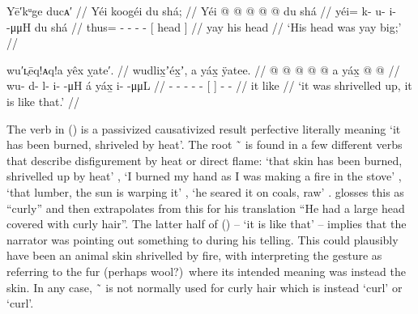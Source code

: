 \ex\label{ex:93-24-head-big}%
%
\begingl
	\glpreamble	Yē′kᵘge ducᴀ′ //
	\glpreamble	Yéi koogéi du shá; // 
	\gla	Yéi @  @ {} @ {} @ {} @ {}
		{} du shá {} //
	\glb	yéi= k- u- i-  -μμH
		{} du shá {} //
	\glc	thus= - - -  -
		{}[  head {}] //
	\gld	yay  {} {} {} {}
		{} his head {} //
	\glft	‘His head was yay big;’
		//
\endgl
\xe

\ex\label{ex:93-25-shriveled-like-that}%
%
\begingl
	\glpreamble	wu′ʟ̣ēq!ᴀq!a yêx ỵate′. //
	\glpreamble	wudlix̱ʼéx̱ʼ, a yáx̱ ÿatee. //
	\gla	{} @ {} @ {} @ {} @ {} @ {}
		{} a yáx̱ {}
		 @ {} @ {} //
	\glb	wu- d- l- i-  -μH
		{} á yáx̱ {}
		i-  -μμL //
	\glc	{}- - - -  -
		{}[   {}]
		-  - //
	\gld	 {} {} {} {} {} {}
		{} it like {}
		 {} {} //
	\glft	‘it was shrivelled up, it is like that.’
		//
\endgl
\xe

The verb  in (\lastx) is a passivized causativized result perfective literally meaning ‘it has been burned, shriveled by heat’.
The root  \~\  is found in a few different verbs that describe disfigurement by heat or direct flame:  ‘that skin has been burned, shrivelled up by heat’ \parencite[38.362]{story-naish:1973},  ‘I burned my hand as I was making a fire in the stove’ \parencite[388.364]{story-naish:1973},  ‘that lumber, the sun is warping it’ \parencite[242]{story-naish:1973},  ‘he seared it on coals, raw’ \parencite[f01/188]{leer:1973}.
\citeauthor{swanton:1909} glosses this as “curly” and then extrapolates from this for his translation “He had a large head covered with curly hair”.
The latter half of (\lastx) –  ‘it is like that’ – implies that the narrator was pointing out something to \citeauthor{swanton:1909} during his telling.
This could plausibly have been an animal skin shrivelled by fire, with \citeauthor{swanton:1909} interpreting the gesture as referring to the fur (perhaps wool?)\ where its intended meaning was instead the skin.
In any case,  \~\  is not normally used for curly hair which is instead  ‘curl’ or  ‘curl’.

